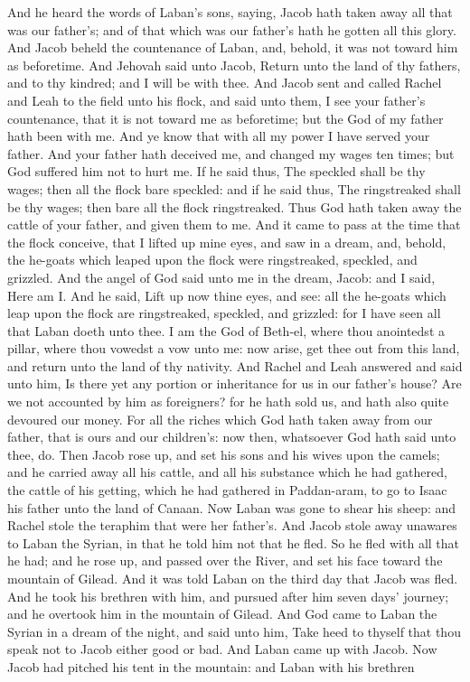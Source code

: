 And he heard the words of Laban’s sons, saying, Jacob hath taken away all that was our father’s; and of that which was our father’s hath he gotten all this glory. And Jacob beheld the countenance of Laban, and, behold, it was not toward him as beforetime. And Jehovah said unto Jacob, Return unto the land of thy fathers, and to thy kindred; and I will be with thee. And Jacob sent and called Rachel and Leah to the field unto his flock, and said unto them, I see your father’s countenance, that it is not toward me as beforetime; but the God of my father hath been with me. And ye know that with all my power I have served your father. And your father hath deceived me, and changed my wages ten times; but God suffered him not to hurt me. If he said thus, The speckled shall be thy wages; then all the flock bare speckled: and if he said thus, The ringstreaked shall be thy wages; then bare all the flock ringstreaked. Thus God hath taken away the cattle of your father, and given them to me. And it came to pass at the time that the flock conceive, that I lifted up mine eyes, and saw in a dream, and, behold, the he-goats which leaped upon the flock were ringstreaked, speckled, and grizzled. And the angel of God said unto me in the dream, Jacob: and I said, Here am I. And he said, Lift up now thine eyes, and see: all the he-goats which leap upon the flock are ringstreaked, speckled, and grizzled: for I have seen all that Laban doeth unto thee. I am the God of Beth-el, where thou anointedst a pillar, where thou vowedst a vow unto me: now arise, get thee out from this land, and return unto the land of thy nativity. And Rachel and Leah answered and said unto him, Is there yet any portion or inheritance for us in our father’s house? Are we not accounted by him as foreigners? for he hath sold us, and hath also quite devoured our money. For all the riches which God hath taken away from our father, that is ours and our children’s: now then, whatsoever God hath said unto thee, do.  Then Jacob rose up, and set his sons and his wives upon the camels; and he carried away all his cattle, and all his substance which he had gathered, the cattle of his getting, which he had gathered in Paddan-aram, to go to Isaac his father unto the land of Canaan. Now Laban was gone to shear his sheep: and Rachel stole the teraphim that were her father’s. And Jacob stole away unawares to Laban the Syrian, in that he told him not that he fled. So he fled with all that he had; and he rose up, and passed over the River, and set his face toward the mountain of Gilead.  And it was told Laban on the third day that Jacob was fled. And he took his brethren with him, and pursued after him seven days’ journey; and he overtook him in the mountain of Gilead. And God came to Laban the Syrian in a dream of the night, and said unto him, Take heed to thyself that thou speak not to Jacob either good or bad. And Laban came up with Jacob. Now Jacob had pitched his tent in the mountain: and Laban with his brethren 